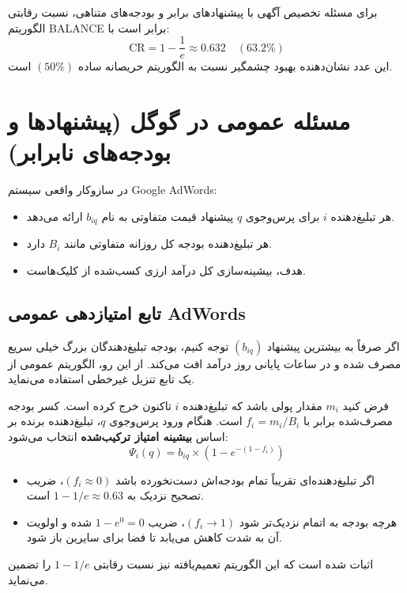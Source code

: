 \begin{theorem}
برای مسئله تخصیص آگهی با پیشنهادهای برابر و بودجه‌های متناهی، نسبت رقابتی الگوریتم BALANCE برابر است با:
\begin{equation}
\text{CR} = 1 - \frac{1}{e} \approx 0.632 \quad (63.2\%)
\end{equation}
این عدد نشان‌دهنده بهبود چشمگیر نسبت به الگوریتم حریصانه ساده $(50\%)$ است.
\end{theorem}

\section{مسئله عمومی \texorpdfstring{}{AdWords} در گوگل (پیشنهادها و بودجه‌های نابرابر)}
در سازوکار واقعی سیستم Google AdWords:
\begin{itemize}
    \item هر تبلیغ‌دهنده $i$ برای پرس‌وجوی $q$ پیشنهاد قیمت متفاوتی به نام $b_{iq}$ ارائه می‌دهد.
    \item هر تبلیغ‌دهنده بودجه کل روزانه متفاوتی مانند $B_i$ دارد.
    \item هدف، بیشینه‌سازی کل درآمد ارزی کسب‌شده از کلیک‌هاست.
\end{itemize}

\subsection{تابع امتیازدهی عمومی AdWords}
اگر صرفاً به بیشترین پیشنهاد $(b_{iq})$ توجه کنیم، بودجه تبلیغ‌دهندگان بزرگ خیلی سریع مصرف شده و در ساعات پایانی روز درآمد افت می‌کند. از این رو، الگوریتم عمومی از یک تابع تنزیل غیرخطی استفاده می‌نماید.

فرض کنید $m_i$ مقدار پولی باشد که تبلیغ‌دهنده $i$ تاکنون خرج کرده است. کسر بودجه مصرف‌شده برابر با $f_i = m_i / B_i$ است.
هنگام ورود پرس‌وجوی $q$، تبلیغ‌دهنده برنده بر اساس \textbf{بیشینه امتیاز ترکیب‌شده} انتخاب می‌شود:
\begin{equation}
\Psi_i(q) = b_{iq} \times \left( 1 - e^{-(1 - f_i)} \right)
\end{equation}
\begin{itemize}
    \item اگر تبلیغ‌دهنده‌ای تقریباً تمام بودجه‌اش دست‌نخورده باشد $(f_i \approx 0)$، ضریب تصحیح نزدیک به $1 - 1/e \approx 0.63$ است.
    \item هرچه بودجه به اتمام نزدیک‌تر شود $(f_i \to 1)$، ضریب $1 - e^0 = 0$ شده و اولویت آن به شدت کاهش می‌یابد تا فضا برای سایرین باز شود.
\end{itemize}
اثبات شده است که این الگوریتم تعمیم‌یافته نیز نسبت رقابتی $1 - 1/e$ را تضمین می‌نماید.

